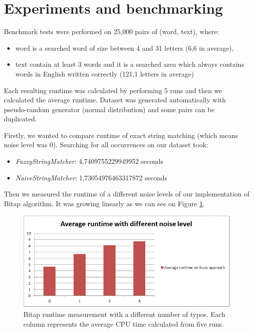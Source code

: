\documentclass[12pt,a4paper,titlepage,final]{article}
\begin{document}
\section{Experiments and benchmarking} \label{test}
Benchmark tests were performed on 25,000 pairs of (word, text), where:
	\begin{itemize}
		\item word is a searched word of size between 4 and 31 letters (6,6 in average),
		\item text contain at least 3 words and it is a searched area which always
contains words in English written correctly (121,1 letters in average)
	\end{itemize}

Each resulting runtime was calculated by performing 5 runs and then we calculated the average runtime. Dataset was generated automatically with pseudo-random generator (normal distribution) and some pairs can be duplicated. 

Firstly, we wanted to compare runtime of exact string matching (which means noise level was 0). Searching for all occurrences on our dataset took:
	\begin{itemize}
		\item \textit{FuzzyStringMatcher}: 4,7409755229949952 seconds
		\item \textit{NaiveStringMatcher}: 1,73054976463317872 seconds
	\end{itemize}
	
Then we measured the runtime of a different noise levels of our implementation of Bitap algorithm. It was growing linearly as we can see on Figure \ref{fig:bitap-noise-level}.

\begin{figure}[H]
	\centering
	\includegraphics[height=5cm,keepaspectratio]{img/bitap-noise-graph.png}
	\caption{Bitap runtime measurement with a different number of typos. Each column represents the average CPU time calculated from five runs.}
	\label{fig:bitap-noise-level}
\end{figure}
\end{document}
